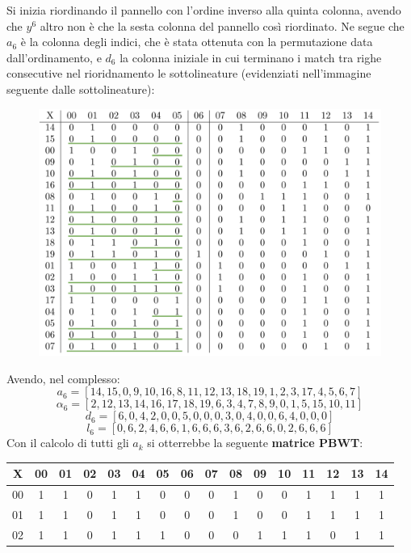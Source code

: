 \begin{esempio}
\begin{table}[H]
\begin{tabular}{c|ccccccccccccccc}
    \end{tabular}
  \end{table}
  Si inizia riordinando il pannello con l'ordine inverso alla
  quinta colonna, avendo che $y^6$ altro non è che la sesta colonna del pannello
  così riordinato. Ne segue che $a_6$ è la colonna degli indici, che è stata
  ottenuta con la permutazione data dall'ordinamento, e $d_6$ la
  colonna iniziale in cui terminano i match tra righe consecutive nel
  rioridnamento le sottolineature (evidenziati nell'immagine seguente dalle
  sottolineature):   
  \begin{figure}[H]
    \centering
    \includegraphics[scale = 0.315]{img/matrix1.pdf}
  \end{figure}
  \noindent
  Avendo, nel complesso:
  \[a_6=[14,15,0,9,10,16,8,11,12,13,18,19,1,2,3,17,4,5,6,7]\]
  \[\alpha_6=[2,12,13,14,16,17,18,19,6,3,4,7,8,9,0,1,5,15,10,11]\]
  \[d_6=[6,0,4,2,0,0,5,0,0,0,3,0,4,0,0,6,4,0,0,0]\]
  \[l_6=[0,6,2,4,6,6,1,6,6,6,3,6,2,6,6,0,2,6,6,6]\]
  Con il calcolo di tutti gli $a_k$ si otterrebbe la seguente \textbf{matrice
    PBWT}: 
  \begin{table}[H]
  \centering
  \scriptsize
  \begin{tabular}{c|ccccccccccccccc}
    X & 00 & 01 & 02 & 03 & 04 & 05 & 06 & 07 & 08 & 09 & 10 & 11 & 12 & 13
    & 14 \\
    \hline
    00 & 1 & 1 & 0 & 1 & 1 & 0 & 0 & 0 & 1 & 0 & 0 & 1 & 1 & 1 & 1 \\
    01 & 1 & 1 & 0 & 1 & 1 & 0 & 0 & 0 & 1 & 0 & 0 & 1 & 1 & 1 & 1 \\
    02 & 1 & 1 & 0 & 1 & 1 & 1 & 0 & 0 & 0 & 1 & 1 & 1 & 0 & 1 & 1 \\

\end{tabular}
\end{table}
\end{esempio}
